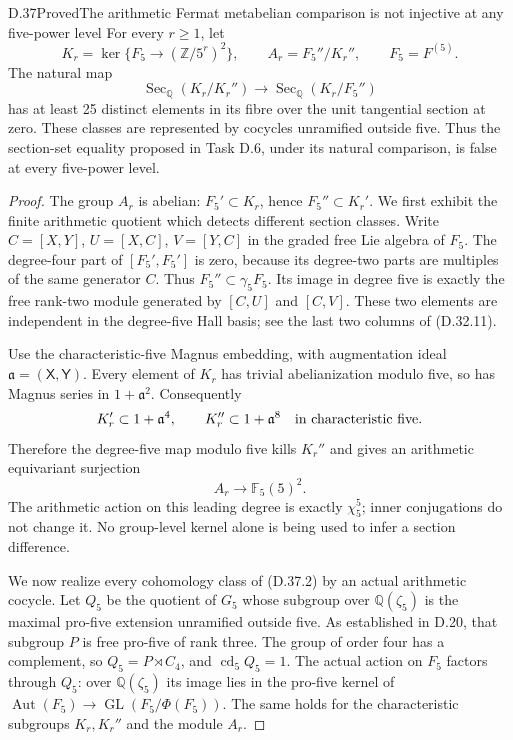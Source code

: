 \begin{statement}{D.37}{Proved}{The arithmetic Fermat metabelian comparison is not injective at any five-power level}
For every \(r\ge1\), let
\[
 K_r=\ker\{F_5\longrightarrow(\mathbb Z/5^r)^2\},
 \qquad A_r=F_5''/K_r'',\qquad F_5=F^{(5)}.
\]
The natural map
\[
 \operatorname{Sec}_{\mathbb Q}(K_r/K_r'')
       \longrightarrow
 \operatorname{Sec}_{\mathbb Q}(K_r/F_5'')
                                                        \tag{D.37.1}
\]
has at least 25 distinct elements in its
fibre over the unit tangential section
at zero. These classes are represented
by cocycles unramified outside five.
Thus the section-set equality proposed
in Task D.6, under its natural comparison,
is false at every five-power level.
\end{statement}
\begin{proof}
The group \(A_r\) is abelian:
\(F_5'\subset K_r\), hence
\(F_5''\subset K_r'\). We first exhibit
the finite arithmetic quotient which
detects different section classes.
Write \(C=[X,Y]\), \(U=[X,C]\),
\(V=[Y,C]\) in the graded free Lie
algebra of \(F_5\). The degree-four
part of \([F_5',F_5']\) is zero,
because its degree-two parts are
multiples of the same generator \(C\).
Thus \(F_5''\subset\gamma_5F_5\).
Its image in degree five is exactly
the free rank-two module generated
by \([C,U]\) and \([C,V]\). These
two elements are independent in the
degree-five Hall basis; see the last
two columns of (D.32.11).

Use the characteristic-five Magnus
embedding, with augmentation ideal
\(\mathfrak a=(\mathsf X,\mathsf Y)\).
Every element of \(K_r\) has trivial
abelianization modulo five, so has
Magnus series in \(1+\mathfrak a^2\).
Consequently
\[
 K_r'\subset1+\mathfrak a^4,\qquad
 K_r''\subset1+\mathfrak a^8
               \quad\hbox{in characteristic five}.
 \]
Therefore the degree-five map modulo
five kills \(K_r''\) and gives an
arithmetic equivariant surjection
\[
         A_r\longrightarrow
             \mathbb F_5(5)^2.                \tag{D.37.2}
\]
The arithmetic action on this leading
degree is exactly \(\chi_5^5\);
inner conjugations do not change it.
No group-level kernel alone is being
used to infer a section difference.

We now realize every cohomology class
of (D.37.2) by an actual arithmetic
cocycle. Let \(Q_5\) be the quotient
of \(G_5\) whose subgroup over
\(\mathbb Q(\zeta_5)\) is the maximal
pro-five extension unramified outside
five. As established in D.20, that
subgroup \(P\) is free pro-five of
rank three. The group of order four
has a complement, so \(Q_5=P\rtimes C_4\),
and \(\operatorname{cd}_5 Q_5=1\).
The actual action on \(F_5\) factors
through \(Q_5\): over \(\mathbb Q(\zeta_5)\)
its image lies in the pro-five kernel
of \(\operatorname{Aut}(F_5)\to
\operatorname{GL}(F_5/\Phi(F_5))\).
The same holds for the characteristic
subgroups \(K_r,K_r''\) and the
module \(A_r\).


\end{proof}
